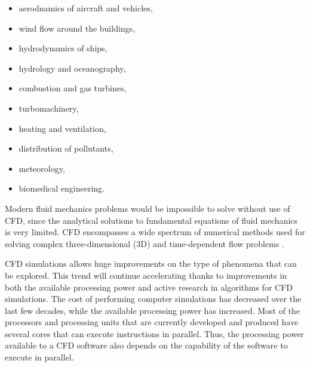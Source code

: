 \begin{itemize}
	\item aerodnamics of aircraft and vehicles,
	\item wind flow around the buildings,
	\item hydrodynamics of ships,
	\item hydrology and oceanography,
	\item combustion and gas turbines,
	\item turbomachinery,
	\item heating and ventilation,
	\item distribution of pollutants,
	\item meteorology,
	\item biomedical engineering.
\end{itemize}

Modern fluid mechanics problems would be impossible to solve without use of CFD, since the analytical solutions to fundamental equations of fluid mechanics is very limited. CFD encompasses a wide spectrum of numerical methods used for solving complex three-dimensional (3D) and time-dependent flow problems \citep{rapp2017}. 

CFD simulations allows huge improvements on the type of phenomena that can be explored. This trend will continue accelerating thanks to improvements in both the available processing power and active research in algorithms for CFD simulations. The cost of performing computer simulations has decreased over the last few decades, while the available processing power has increased. Most of the processors and processing units that are currently developed and produced have several cores that can execute instructions in parallel. Thus, the processing power available to a CFD software also depends on the capability of the software to execute in parallel.



